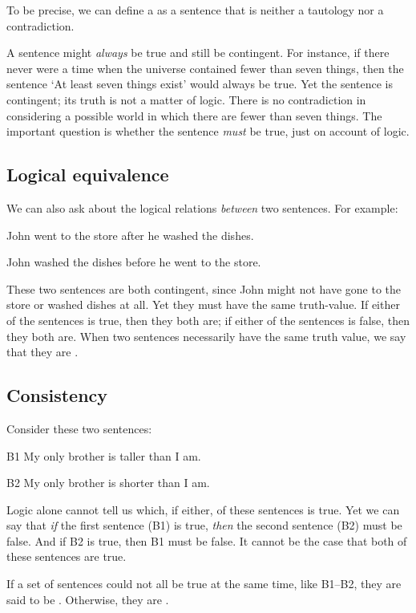 To be precise, we can define a  as a sentence that is neither a tautology nor a contradiction.

A sentence might \emph{always} be true and still be contingent. For instance, if there never were a time when the universe contained fewer than seven things, then the sentence `At least seven things exist' would always be true. Yet the sentence is contingent; its truth is not a matter of logic. There is no contradiction in considering a possible world in which there are fewer than seven things. The important question is whether the sentence \emph{must} be true, just on account of logic.

\subsection{Logical equivalence}
We can also ask about the logical relations \emph{between} two sentences. For example:
\begin{earg}
\item[] John went to the store after he washed the dishes.
\item[] John washed the dishes before he went to the store.
\end{earg}
These two sentences are both contingent, since John might not have gone to the store or washed dishes at all. Yet they must have the same truth-value. If either of the sentences is true, then they both are; if either of the sentences is false, then they both are. When two sentences necessarily have the same truth value, we say that they are .

\subsection{Consistency}
Consider these two sentences:
\begin{ekey}
\item[B1] My only brother is taller than I am.
\item[B2] My only brother is shorter than I am.
\end{ekey}
Logic alone cannot tell us which, if either, of these sentences is true. Yet we can say that \emph{if} the first sentence (B1) is true, \emph{then} the second sentence (B2) must be false. And if B2 is true, then B1 must be false. It cannot be the case that both of these sentences are true.

If a set of sentences could not all be true at the same time, like B1--B2, they are said to be . Otherwise, they are .

